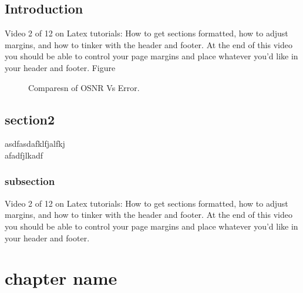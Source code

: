 \documentclass[12pt]{report}
\begin{document}
\section{Introduction}
Video 2 of 12 on Latex tutorials: How to get sections formatted, how to adjust margins, and how to tinker with the header and footer. At the end of this video you should be able to control your page margins and place whatever you'd like in your header and footer. Figure
\begin{figure}[htbp]
	\caption{Comparesn of OSNR Vs Error.}
	\label{fig1}
\end{figure}
\section{section2}
asdfasdafklfjalfkj\\
afadfjlkadf

\subsection*{subsection}
Video 2 of 12 on Latex tutorials: How to get sections formatted, how to adjust margins, and how to tinker with the header and footer. At the end of this video you should be able to control your page margins and place whatever you'd like in your header and footer.

\chapter{chapter name}
\end{document}
